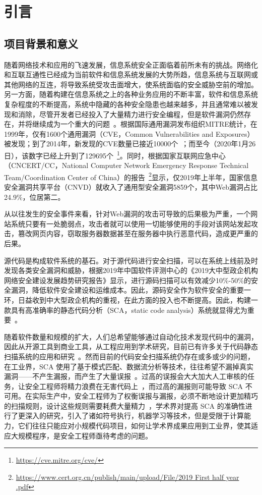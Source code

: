 \chapter{引言}

\section{项目背景和意义}
随着网络技术和应用的飞速发展，信息系统安全正面临着前所未有的挑战。网络化和互联互通性已经成为当前软件和信息系统发展的大势所趋，信息系统与互联网或其他网络的互连，将导致系统受攻击面增大，使系统面临的安全威胁空前的增加。另一方面，随着构建在信息系统之上的各种业务应用的不断丰富，软件和信息系统复杂程度的不断提高，系统中隐藏的各种安全隐患也越来越多，并且通常难以被发现和消除，尽管开发者已经投入了大量精力进行安全编程，但是软件漏洞仍然存在，并将继续成为一个重大的问题~\cite{vuldeepecker}。根据国际通用漏洞发布组织MITRE统计，在1999年，仅有1600个通用漏洞（CVE，Common Vulnerabilities and Exposures）被发现；到了2014年，新发现的CVE数量已接近10000个~\cite{liujian2018}；而至今（2020年1月26日），该数字已经上升到了129695个~\footnote{\url{https://cve.mitre.org/cve/}}。同时，根据国家互联网应急中心（CNCERT/CC，National Computer Network Emergency Response Technical Team/Coordination Center of China）的报告~\footnote{\url{https://www.cert.org.cn/publish/main/upload/File/2019 First half year .pdf}}显示，仅2019年上半年，国家信息安全漏洞共享平台（CNVD）就收入了通用型安全漏洞5859个，其中Web漏洞占比24.9\%，位居第二。

从以往发生的安全事件来看，针对Web漏洞的攻击可导致的后果极为严重，一个网站系统只要有一处脆弱点，攻击者就可以使用一切能够使用的手段对该网站发起攻击，篡改网页内容，窃取服务器数据甚至在服务器中执行恶意代码，造成更严重的后果。

源代码是构成软件系统的基石。对于源代码进行安全扫描，可以在系统上线前及时发现各类安全漏洞和威胁，根据2019年中国软件评测中心的《2019大中型政企机构网络安全建设发展趋势研究报告》显示，进行源码扫描可以有效减少10\%-50\%的安全漏洞，降低软件安全建设和运维成本。因此，源码安全作为软件安全的重要一环，日益收到中大型政企机构的重视，在此方面的投入也不断提高。因此，构建一款具有高准确率的静态代码分析（SCA，static code analysis）系统就显得尤为重要~\cite{aletheia}。

随着软件数量和规模的扩大，人们总希望能够通过自动化技术发现代码中的漏洞，因此从开源工具到商业工具，从工程应用到学术研究，目前已有许多关于代码静态扫描系统的应用和研究~\cite{li2016vulpecker,leopard,sym:exe,taint:finding,vuldeepecker,taint:taj,Koc2019,sym:cute,atp:saturn,sym:klee,atp:escjava,Koc2017,pixy,aletheia}。然而目前的代码安全扫描系统仍存在或多或少的问题，在工业界，SCA 使用了基于模式匹配、数据流分析等技术，往往希望不漏掉真实漏洞——不产生漏报，而产生了大量误报~\cite{falseAlarm,aletheia,falsepositive}。过高的误报会大大加大人工审核的任务，让安全工程师将精力浪费在无害代码上~\cite{leopard}，而过高的漏报则可能导致 SCA 不可用。在实际生产中，安全工程师为了权衡误报与漏报，必须不断地设计更加精巧的扫描规则，设计这些规则需要耗费大量精力~\cite{taintStyle,vuldeepecker}，学术界对提高 SCA 的准确性进行了更深入的研究，引入了诸如符号执行，机器学习等技术，但是受限于计算能力，它们往往只能应对小规模代码项目，如何让学术界成果应用到工业界，使其适应大规模程序，是安全工程师亟待考虑的问题。

